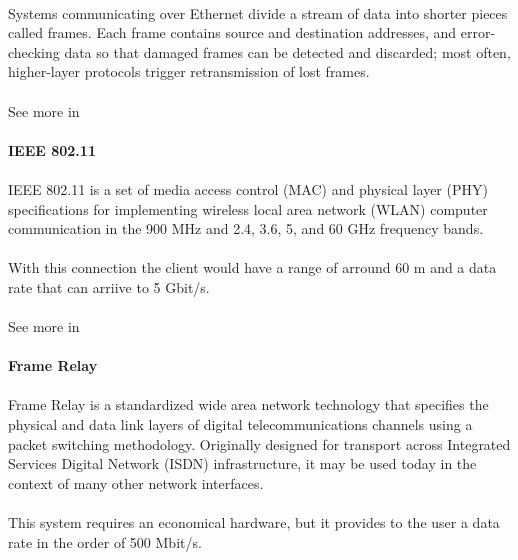 \paragraph{}
Systems communicating over Ethernet divide a stream of data into shorter pieces called frames. Each frame contains source and destination addresses, and error-checking data so that damaged frames can be detected and discarded; most often, higher-layer protocols trigger retransmission of lost frames.
\paragraph{}
See more in \cite{Ethernet}

\paragraph{} \textbf{IEEE 802.11}
\paragraph{}
IEEE 802.11 is a set of media access control (MAC) and physical layer (PHY) specifications for implementing wireless local area network (WLAN) computer communication in the 900 MHz and 2.4, 3.6, 5, and 60 GHz frequency bands. 
\paragraph{}
With this connection the client would have a range of arround 60 m and  a data rate that can arriive to 5 Gbit/s.
\paragraph{}
See more in \cite{80211}

\paragraph{} \textbf{Frame Relay}
\paragraph{}
Frame Relay is a standardized wide area network technology that specifies the physical and data link layers of digital telecommunications channels using a packet switching methodology. Originally designed for transport across Integrated Services Digital Network (ISDN) infrastructure, it may be used today in the context of many other network interfaces.
\paragraph{}
This system requires an economical hardware, but it provides to the user a data rate in the order of 500 Mbit/s.
